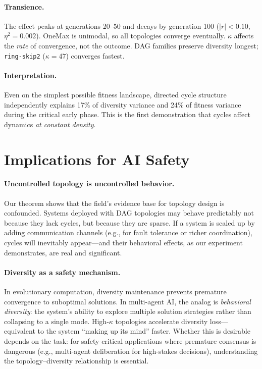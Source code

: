 \documentclass[10pt,twocolumn]{article}
\begin{document}
\paragraph{Transience.}
The effect peaks at generations 20--50 and decays by generation 100
($|r| < 0.10$, $\eta^2 = 0.002$). OneMax is unimodal, so all topologies
converge eventually. $\kappa$ affects the \emph{rate} of convergence, not
the outcome. DAG families preserve diversity longest; \texttt{ring-skip2}
($\kappa = 47$) converges fastest.

\paragraph{Interpretation.}
Even on the simplest possible fitness landscape, directed cycle structure
independently explains 17\% of diversity variance and 24\% of fitness
variance during the critical early phase. This is the first demonstration
that cycles affect dynamics \emph{at constant density}.

\section{Implications for AI Safety}
\label{sec:safety}

\paragraph{Uncontrolled topology is uncontrolled behavior.}
Our theorem shows that the field's evidence base for topology design is
confounded. Systems deployed with DAG topologies may behave predictably
not because they lack cycles, but because they are sparse. If a system
is scaled up by adding communication channels (e.g., for fault tolerance
or richer coordination), cycles will inevitably appear---and their
behavioral effects, as our experiment demonstrates, are real and
significant.

\paragraph{Diversity as a safety mechanism.}
In evolutionary computation, diversity maintenance prevents premature
convergence to suboptimal solutions. In multi-agent AI, the analog is
\emph{behavioral diversity}: the system's ability to explore multiple
solution strategies rather than collapsing to a single mode.
High-$\kappa$ topologies accelerate diversity loss---equivalent to the
system ``making up its mind'' faster. Whether this is desirable depends
on the task: for safety-critical applications where premature consensus
is dangerous (e.g., multi-agent deliberation for high-stakes decisions),
understanding the topology--diversity relationship is essential.
\end{document}
